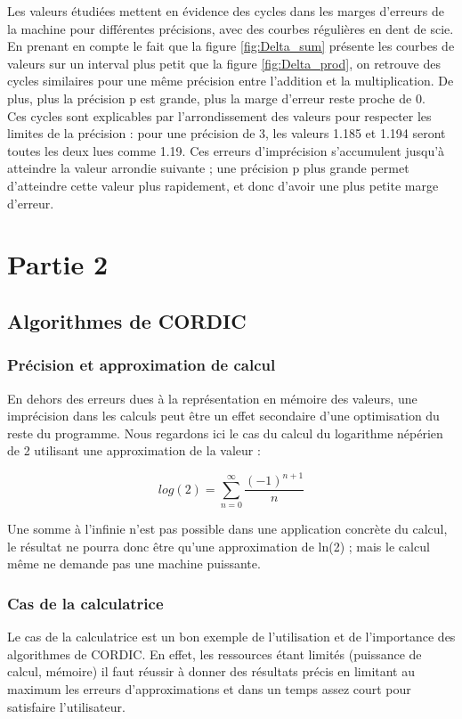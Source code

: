 \documentclass[svgnames]{report}
\begin{document}
Les valeurs étudiées mettent en évidence des cycles dans les marges d'erreurs de la machine pour différentes précisions, avec des courbes régulières en dent de scie. En prenant en compte le fait que la figure \ref{fig:Delta_sum} présente les courbes de valeurs sur un interval plus petit que la figure \ref{fig:Delta_prod}, on retrouve des cycles similaires pour une même précision entre l'addition et la multiplication. De plus, plus la précision p est grande, plus la marge d'erreur reste proche de 0.\\

Ces cycles sont explicables par l'arrondissement des valeurs pour respecter les limites de la précision : pour une précision de 3, les valeurs 1.185 et 1.194 seront toutes les deux lues comme 1.19. Ces erreurs d'imprécision s'accumulent jusqu'à atteindre la valeur arrondie suivante ; une précision p plus grande permet d'atteindre cette valeur plus rapidement, et donc d'avoir une plus petite marge d'erreur.\\

\chapter{Partie 2}
\section{Algorithmes de CORDIC}

\subsection{Précision et approximation de calcul}

En dehors des erreurs dues à la représentation en mémoire des valeurs, une imprécision dans les calculs peut être un effet secondaire d'une optimisation du reste du programme. Nous regardons ici le cas du calcul du logarithme népérien de 2 utilisant une approximation de la valeur :

\[log(2) = \sum_{n=0}^{\infty}\frac{(-1)^{n+1}}{n}\]

Une somme à l'infinie n'est pas possible dans une application concrète du calcul, le résultat ne pourra donc être qu'une approximation de ln(2) ; mais le calcul même ne demande pas une machine puissante.

\subsection{Cas de la calculatrice}
Le cas de la calculatrice est un bon exemple de l'utilisation et de l'importance des algorithmes de CORDIC. En effet, les ressources étant limités (puissance de calcul, mémoire) il faut réussir à donner des résultats précis en limitant au maximum les erreurs d'approximations et dans un temps assez court pour satisfaire l'utilisateur.
\end{document}
